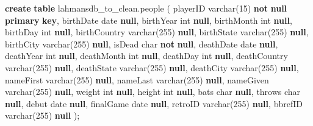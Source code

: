 \documentclass[11pt]{article}
\newenvironment{Shaded}{}{}
\newcommand{\KeywordTok}[1]{\textcolor[rgb]{0.00,0.44,0.13}{\textbf{{#1}}}}
\newcommand{\DataTypeTok}[1]{\textcolor[rgb]{0.56,0.13,0.00}{{#1}}}
\newcommand{\DecValTok}[1]{\textcolor[rgb]{0.25,0.63,0.44}{{#1}}}
\newcommand{\NormalTok}[1]{{#1}}
\begin{document}
    \begin{Shaded}
\begin{Highlighting}[]
\KeywordTok{create} \KeywordTok{table}\NormalTok{ lahmansdb\_to\_clean.people}
\NormalTok{(}
\NormalTok{    playerID }\DataTypeTok{varchar}\NormalTok{(}\DecValTok{15}\NormalTok{) }\KeywordTok{not} \KeywordTok{null}
        \KeywordTok{primary} \KeywordTok{key}\NormalTok{,}
\NormalTok{    birthDate }\DataTypeTok{date} \KeywordTok{null}\NormalTok{,}
\NormalTok{    birthYear }\DataTypeTok{int} \KeywordTok{null}\NormalTok{,}
\NormalTok{    birthMonth }\DataTypeTok{int} \KeywordTok{null}\NormalTok{,}
\NormalTok{    birthDay }\DataTypeTok{int} \KeywordTok{null}\NormalTok{,}
\NormalTok{    birthCountry }\DataTypeTok{varchar}\NormalTok{(}\DecValTok{255}\NormalTok{) }\KeywordTok{null}\NormalTok{,}
\NormalTok{    birthState }\DataTypeTok{varchar}\NormalTok{(}\DecValTok{255}\NormalTok{) }\KeywordTok{null}\NormalTok{,}
\NormalTok{    birthCity }\DataTypeTok{varchar}\NormalTok{(}\DecValTok{255}\NormalTok{) }\KeywordTok{null}\NormalTok{,}
\NormalTok{    isDead }\DataTypeTok{char} \KeywordTok{not} \KeywordTok{null}\NormalTok{,}
\NormalTok{    deathDate }\DataTypeTok{date} \KeywordTok{null}\NormalTok{,}
\NormalTok{    deathYear }\DataTypeTok{int} \KeywordTok{null}\NormalTok{,}
\NormalTok{    deathMonth }\DataTypeTok{int} \KeywordTok{null}\NormalTok{,}
\NormalTok{    deathDay }\DataTypeTok{int} \KeywordTok{null}\NormalTok{,}
\NormalTok{    deathCountry }\DataTypeTok{varchar}\NormalTok{(}\DecValTok{255}\NormalTok{) }\KeywordTok{null}\NormalTok{,}
\NormalTok{    deathState }\DataTypeTok{varchar}\NormalTok{(}\DecValTok{255}\NormalTok{) }\KeywordTok{null}\NormalTok{,}
\NormalTok{    deathCity }\DataTypeTok{varchar}\NormalTok{(}\DecValTok{255}\NormalTok{) }\KeywordTok{null}\NormalTok{,}
\NormalTok{    nameFirst }\DataTypeTok{varchar}\NormalTok{(}\DecValTok{255}\NormalTok{) }\KeywordTok{null}\NormalTok{,}
\NormalTok{    nameLast }\DataTypeTok{varchar}\NormalTok{(}\DecValTok{255}\NormalTok{) }\KeywordTok{null}\NormalTok{,}
\NormalTok{    nameGiven }\DataTypeTok{varchar}\NormalTok{(}\DecValTok{255}\NormalTok{) }\KeywordTok{null}\NormalTok{,}
\NormalTok{    weight }\DataTypeTok{int} \KeywordTok{null}\NormalTok{,}
\NormalTok{    height }\DataTypeTok{int} \KeywordTok{null}\NormalTok{,}
\NormalTok{    bats }\DataTypeTok{char} \KeywordTok{null}\NormalTok{,}
\NormalTok{    throws }\DataTypeTok{char} \KeywordTok{null}\NormalTok{,}
\NormalTok{    debut }\DataTypeTok{date} \KeywordTok{null}\NormalTok{,}
\NormalTok{    finalGame }\DataTypeTok{date} \KeywordTok{null}\NormalTok{,}
\NormalTok{    retroID }\DataTypeTok{varchar}\NormalTok{(}\DecValTok{255}\NormalTok{) }\KeywordTok{null}\NormalTok{,}
\NormalTok{    bbrefID }\DataTypeTok{varchar}\NormalTok{(}\DecValTok{255}\NormalTok{) }\KeywordTok{null}
\NormalTok{);}

\end{Highlighting}
\end{Shaded}
\end{document}
